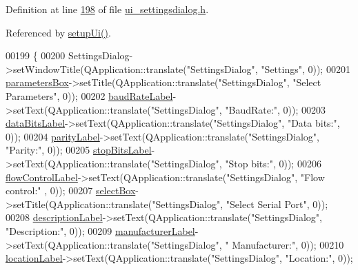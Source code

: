 Definition at line \hyperlink{a00054_source_l00198}{198} of file \hyperlink{a00054_source}{ui\+\_\+settingsdialog.\+h}.



Referenced by \hyperlink{a00054_source_l00061}{setup\+Ui()}.


\begin{DoxyCode}
00199     \{
00200         SettingsDialog->setWindowTitle(QApplication::translate(\textcolor{stringliteral}{"SettingsDialog"}, \textcolor{stringliteral}{"Settings"}, 0));
00201         \hyperlink{a00029_a47cebbe70a990bd1f309250101022889}{parametersBox}->setTitle(QApplication::translate(\textcolor{stringliteral}{"SettingsDialog"}, \textcolor{stringliteral}{"Select Parameters"},
       0));
00202         \hyperlink{a00029_a57e59712bae4f482b1ff1d61c81471e8}{baudRateLabel}->setText(QApplication::translate(\textcolor{stringliteral}{"SettingsDialog"}, \textcolor{stringliteral}{"BaudRate:"}, 0));
00203         \hyperlink{a00029_a4d827d5f217aa166e228b0e2c9c5aaf7}{dataBitsLabel}->setText(QApplication::translate(\textcolor{stringliteral}{"SettingsDialog"}, \textcolor{stringliteral}{"Data bits:"}, 0));
00204         \hyperlink{a00029_ae062846ca8db471d7eb362ae39123422}{parityLabel}->setText(QApplication::translate(\textcolor{stringliteral}{"SettingsDialog"}, \textcolor{stringliteral}{"Parity:"}, 0));
00205         \hyperlink{a00029_a665748b39dda24475690e2363b72e265}{stopBitsLabel}->setText(QApplication::translate(\textcolor{stringliteral}{"SettingsDialog"}, \textcolor{stringliteral}{"Stop bits:"}, 0));
00206         \hyperlink{a00029_a7876a6baf43bd21d3b816f6a5a24fffc}{flowControlLabel}->setText(QApplication::translate(\textcolor{stringliteral}{"SettingsDialog"}, \textcolor{stringliteral}{"Flow control:"}
      , 0));
00207         \hyperlink{a00029_aea3871481f7ecb94f1835e519631f9a2}{selectBox}->setTitle(QApplication::translate(\textcolor{stringliteral}{"SettingsDialog"}, \textcolor{stringliteral}{"Select Serial Port"}, 0));
00208         \hyperlink{a00029_aaf2756662f744e79aa3443f1e035870d}{descriptionLabel}->setText(QApplication::translate(\textcolor{stringliteral}{"SettingsDialog"}, \textcolor{stringliteral}{"Description:"},
       0));
00209         \hyperlink{a00029_afeadc7657c9eaa3103bd529342f5fe97}{manufacturerLabel}->setText(QApplication::translate(\textcolor{stringliteral}{"SettingsDialog"}, \textcolor{stringliteral}{"
      Manufacturer:"}, 0));
00210         \hyperlink{a00029_ad860892f11a79cb726643d3478078fcd}{locationLabel}->setText(QApplication::translate(\textcolor{stringliteral}{"SettingsDialog"}, \textcolor{stringliteral}{"Location:"}, 0));

\end{DoxyCode}
